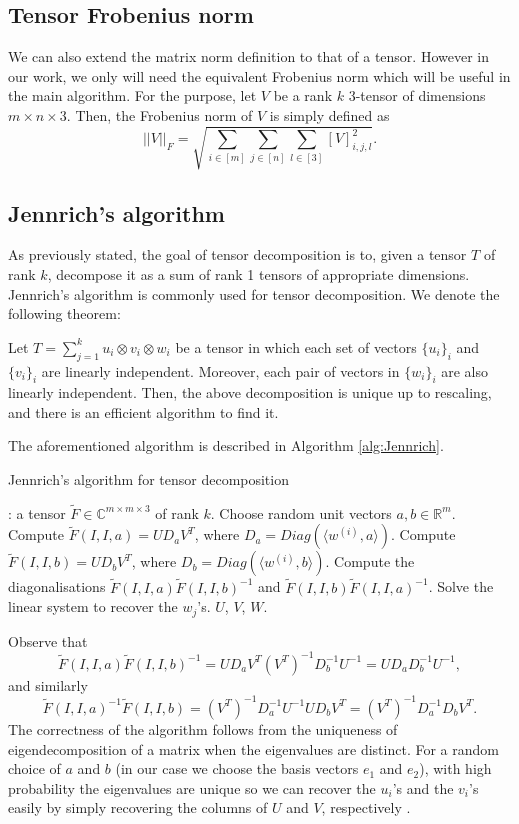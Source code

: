\subsection{Tensor Frobenius norm}
We can also extend the matrix norm definition to that of a tensor. However in our work, we only will need the equivalent Frobenius norm which will be useful in the main algorithm. For the purpose, let $V$ be a rank $k$ 3-tensor of dimensions $m\times n\times 3$. Then, the Frobenius norm of $V$ is simply defined as 
\begin{equation}
    ||V||_F=\sqrt{\sum_{i\in[m]}\sum_{j\in[n]}\sum_{l\in[3]}[V]_{i,j,l}^2}.
\end{equation}
\subsection{Jennrich's algorithm}
As previously stated, the goal of tensor decomposition is to, given a tensor $T$ of rank $k$, decompose it as a sum of rank 1 tensors of appropriate dimensions. Jennrich's algorithm is commonly used for tensor decomposition. We denote the following theorem:
\begin{theorem}
    Let $T=\sum_{j=1}^k u_i\otimes v_i\otimes w_i$ be a tensor in which each set of vectors $\{u_i\}_i$ and $\{v_i\}_i$ are linearly independent. Moreover, each pair of vectors in $\{w_i\}_i$ are also linearly independent. Then, the above decomposition is unique up to rescaling, and there is an efficient algorithm to find it.
\end{theorem}
The aforementioned algorithm is described in Algorithm \ref{alg:Jennrich}.
\begin{algorithm}
    \caption{Jennrich's algorithm for tensor decomposition}
    \label{alg:Jennrich}
    \begin{algorithmic}
        : a tensor $\widetilde{F}\in\mathbb{C}^{m\times m\times 3}$ of rank $k$.
        \State Choose random unit vectors $a,b\in\mathbb{R}^m$.
        \State Compute $\widetilde{F}(I,I,a)=UD_aV^T$, where $D_a=Diag(\langle w^{(i)},a\rangle)$.
        \State Compute $\widetilde{F}(I,I,b)=UD_bV^T$, where $D_b=Diag(\langle w^{(i)},b\rangle)$.
        \State Compute the diagonalisations $\widetilde{F}(I,I,a)\widetilde{F}(I,I,b)^{-1}$ and $\widetilde{F}(I,I,b)\widetilde{F}(I,I,a)^{-1}$.
        \State Solve the linear system to recover the $w_j$'s.
         $U$, $V$, $W$.
    \end{algorithmic}
\end{algorithm}\par
Observe that $$\widetilde{F}(I,I,a)\widetilde{F}(I,I,b)^{-1}=UD_aV^T(V^T)^{-1}D_b^{-1}U^{-1}=UD_aD_b^{-1}U^{-1},$$ and similarly $$\widetilde{F}(I,I,a)^{-1}\widetilde{F}(I,I,b)=(V^T)^{-1}D_a^{-1}U^{-1}UD_bV^T=(V^T)^{-1}D_a^{-1}D_bV^T.$$ The correctness of the algorithm follows from the uniqueness of eigendecomposition of a matrix when the eigenvalues are distinct. For a random choice of $a$ and $b$ (in our case we choose the basis vectors $e_1$ and $e_2$), with high probability the eigenvalues are unique so we can recover the $u_i$'s and the $v_i$'s easily by simply recovering the columns of $U$ and $V$, respectively \cite{algoToolbox}.